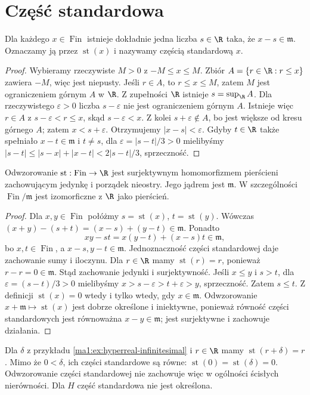 \section{Część standardowa}
\begin{twierdzenie}
\label{ma1:thm:standard-part}
Dla każdego $x\in\operatorname{Fin}$ istnieje dokładnie jedna liczba $s\in\R$ taka, że $x-s\in\mathfrak m$. Oznaczamy ją przez $\operatorname{st}(x)$ i nazywamy częścią standardową $x$.
\end{twierdzenie}
\begin{proof}
Wybieramy rzeczywiste $M>0$ z $-M\le x\le M$. Zbiór $A=\{r\in\R:r\le x\}$ zawiera $-M$, więc jest niepusty. Jeśli $r\in A$, to $r\le x\le M$, zatem $M$ jest ograniczeniem górnym $A$ w $\R$. Z zupełności $\R$ istnieje $s=\sup_{\R}A$.
Dla rzeczywistego $\varepsilon>0$ liczba $s-\varepsilon$ nie jest ograniczeniem górnym $A$. Istnieje więc $r\in A$ z $s-\varepsilon<r\le x$, skąd $s-\varepsilon<x$. Z kolei $s+\varepsilon\notin A$, bo jest większe od kresu górnego $A$; zatem $x<s+\varepsilon$. Otrzymujemy $|x-s|<\varepsilon$.
Gdyby $t\in\R$ także spełniało $x-t\in\mathfrak m$ i $t\ne s$, dla $\varepsilon=|s-t|/3>0$ mielibyśmy $|s-t|\le |s-x|+|x-t|<2|s-t|/3$, sprzeczność.
\end{proof}
\begin{twierdzenie}
\label{ma1:thm:standard-part-hom}
Odwzorowanie $\operatorname{st}:\operatorname{Fin}\to\R$ jest surjektywnym homomorfizmem pierścieni zachowującym jedynkę i porządek nieostry. Jego jądrem jest $\mathfrak m$. W szczególności $\operatorname{Fin}/\mathfrak m$ jest izomorficzne z $\R$ jako pierścień.
\end{twierdzenie}
\begin{proof}
Dla $x,y\in\operatorname{Fin}$ połóżmy $s=\operatorname{st}(x)$, $t=\operatorname{st}(y)$. Wówczas $(x+y)-(s+t)=(x-s)+(y-t)\in\mathfrak m$. Ponadto
\[
 xy-st=x(y-t)+(x-s)t\in\mathfrak m,
\]
bo $x,t\in\operatorname{Fin}$, a $x-s,y-t\in\mathfrak m$. Jednoznaczność części standardowej daje zachowanie sumy i iloczynu. Dla $r\in\R$ mamy $\operatorname{st}(r)=r$, ponieważ $r-r=0\in\mathfrak m$. Stąd zachowanie jedynki i surjektywność.
Jeśli $x\le y$ i $s>t$, dla $\varepsilon=(s-t)/3>0$ mielibyśmy $x>s-\varepsilon>t+\varepsilon>y$, sprzeczność. Zatem $s\le t$. Z definicji $\operatorname{st}(x)=0$ wtedy i tylko wtedy, gdy $x\in\mathfrak m$. Odwzorowanie $x+\mathfrak m\mapsto\operatorname{st}(x)$ jest dobrze określone i iniektywne, ponieważ równość części standardowych jest równoważna $x-y\in\mathfrak m$; jest surjektywne i zachowuje działania.
\end{proof}
\begin{przyklad}
Dla $\delta$ z przykładu \ref{ma1:ex:hyperreal-infinitesimal} i $r\in\R$ mamy $\operatorname{st}(r+\delta)=r$. Mimo że $0<\delta$, ich części standardowe są równe: $\operatorname{st}(0)=\operatorname{st}(\delta)=0$. Odwzorowanie części standardowej nie zachowuje więc w ogólności ścisłych nierówności. Dla $H$ część standardowa nie jest określona.
\end{przyklad}

